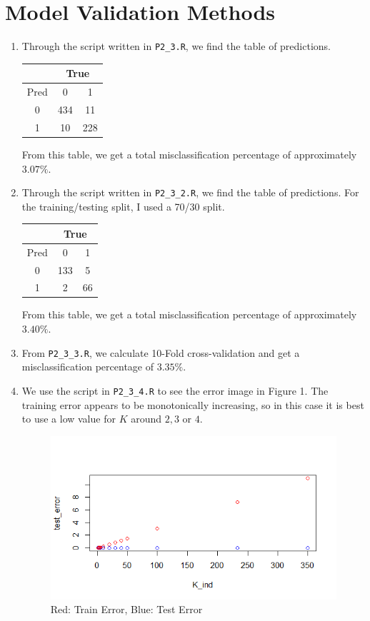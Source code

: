 \documentclass[12pt]{article}
\begin{document}
\section{Model Validation Methods}
\begin{enumerate}
\item
	Through the script written in \texttt{P2\_3.R}, we find the table of predictions.
\begin{center}
	\begin{tabular}{|c|c|c|}
	\hline
	& \multicolumn{2}{|c|}{True} \\
	\hline 
	Pred & 0 & 1 \\
	\hline
	0 & 434 & 11 \\
	\hline 
	1 & 10 & 228\\
	\hline
	\end{tabular}
	\end{center}
	From this table, we get a total misclassification percentage of approximately $3.07\%$.	

\item
	Through the script written in \texttt{P2\_3\_2.R}, we find the table of predictions. For the training/testing split, I used a 70/30 split.
\begin{center}
	\begin{tabular}{|c|c|c|}
	\hline
	& \multicolumn{2}{|c|}{True} \\
	\hline 
	Pred & 0 & 1 \\
	\hline
	0 & 133 & 5 \\
	\hline 
	1 & 2 & 66\\
	\hline
	\end{tabular}
	\end{center}
	From this table, we get a total misclassification percentage of approximately $3.40\%$.	

\item
	From \texttt{P2\_3\_3.R}, we calculate 10-Fold cross-validation and get a misclassification percentage of $3.35\%$.

\item
We use the script in \texttt{P2\_3\_4.R} to see the error image in Figure 1. The training error appears to be monotonically increasing, so in this case it is best to use a low value for $K$ around $2,3$ or $4$.
\begin{figure}
\includegraphics{Rplot}
\caption{Red: Train Error, Blue: Test Error}
\end{figure}

\end{enumerate}
\end{document}
